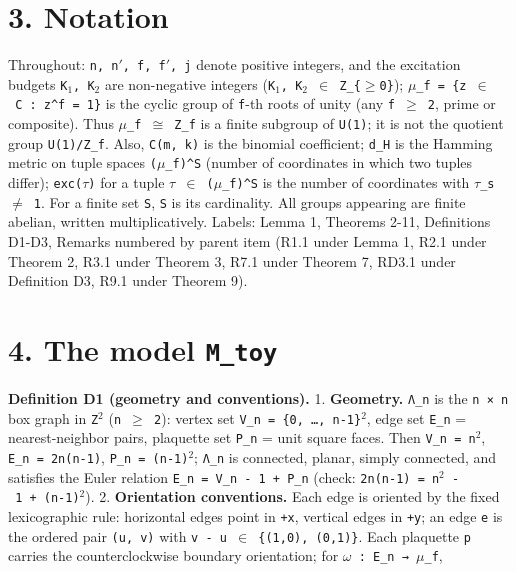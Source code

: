 \documentclass[
  american,
  11pt,
  letterpaper,
]{article}
\begin{document}
\section{3. Notation}\label{notation}

Throughout: \texttt{n,\ n\ensuremath{'},\ f,\ f\ensuremath{'},\ j} denote positive integers, and the excitation budgets \texttt{K\ensuremath{{}_{1}},\ K\ensuremath{{}_{2}}} are non-negative integers (\texttt{K\ensuremath{{}_{1}},\ K\ensuremath{{}_{2}}\ \ensuremath{\in}\ Z\_\{\ensuremath{\geq}0\}}); \texttt{\ensuremath{\mu}\_f\ =\ \{z\ \ensuremath{\in}\ C\ :\ z\^{}f\ =\ 1\}} is the cyclic group of \texttt{f}-th roots of unity (any \texttt{f\ \ensuremath{\geq}\ 2}, prime or composite). Thus \texttt{\ensuremath{\mu}\_f\ \ensuremath{\cong}\ Z\_f} is a finite subgroup of \texttt{U(1)}; it is not the quotient group \texttt{U(1)/Z\_f}. Also, \texttt{C(m,\ k)} is the binomial coefficient; \texttt{d\_H} is the Hamming metric on tuple spaces \texttt{(\ensuremath{\mu}\_f)\^{}S} (number of coordinates in which two tuples differ); \texttt{exc(\ensuremath{\tau})} for a tuple \texttt{\ensuremath{\tau}\ \ensuremath{\in}\ (\ensuremath{\mu}\_f)\^{}S} is the number of coordinates with \texttt{\ensuremath{\tau}\_s\ \ensuremath{\neq}\ 1}. For a finite set \texttt{S}, \texttt{\textbar{}S\textbar{}} is its cardinality. All groups appearing are finite abelian, written multiplicatively. Labels: Lemma 1, Theorems 2-11, Definitions D1-D3, Remarks numbered by parent item (R1.1 under Lemma 1, R2.1 under Theorem 2, R3.1 under Theorem 3, R7.1 under Theorem 7, RD3.1 under Definition D3, R9.1 under Theorem 9).

\section{\texorpdfstring{4. The model \texttt{M\_toy}}{4. The model M\_toy}}\label{the-model-m_toy}

\textbf{Definition D1 (geometry and conventions).} 1. \textbf{Geometry.} \texttt{Λ\_n} is the \texttt{n\ ×\ n} box graph in \texttt{Z\ensuremath{{}^{2}}} (\texttt{n\ \ensuremath{\geq}\ 2}): vertex set \texttt{V\_n\ =\ \{0,\ …,\ n-1\}\ensuremath{{}^{2}}}, edge set \texttt{E\_n} = nearest-neighbor pairs, plaquette set \texttt{P\_n} = unit square faces. Then \texttt{\textbar{}V\_n\textbar{}\ =\ n\ensuremath{{}^{2}}}, \texttt{\textbar{}E\_n\textbar{}\ =\ 2n(n-1)}, \texttt{\textbar{}P\_n\textbar{}\ =\ (n-1)\ensuremath{{}^{2}}}; \texttt{Λ\_n} is connected, planar, simply connected, and satisfies the Euler relation \texttt{\textbar{}E\_n\textbar{}\ =\ \textbar{}V\_n\textbar{}\ -\ 1\ +\ \textbar{}P\_n\textbar{}} (check: \texttt{2n(n-1)\ =\ n\ensuremath{{}^{2}}\ -\ 1\ +\ (n-1)\ensuremath{{}^{2}}}). 2. \textbf{Orientation conventions.} Each edge is oriented by the fixed lexicographic rule: horizontal edges point in \texttt{+x}, vertical edges in \texttt{+y}; an edge \texttt{e} is the ordered pair \texttt{(u,\ v)} with \texttt{v\ -\ u\ \ensuremath{\in}\ \{(1,0),\ (0,1)\}}. Each plaquette \texttt{p} carries the counterclockwise boundary orientation; for \texttt{\ensuremath{\omega}\ :\ E\_n\ →\ \ensuremath{\mu}\_f},
\end{document}
